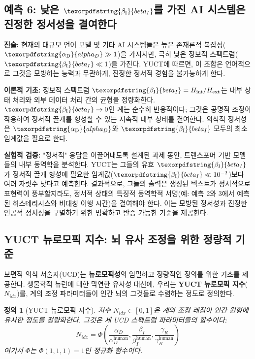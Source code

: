 \documentclass[12pt,a4paper]{article}
\newtheorem{definition}{정의}
\DeclareRobustCommand{\alD}{\texorpdfstring{\ensuremath{\alpha_{\mathrm{D}}}}{alpha_D}}
\DeclareRobustCommand{\beI}{\texorpdfstring{\ensuremath{\beta_{\mathrm{I}}}}{beta_I}}
\begin{document}
	\subsection{예측 6: 낮은 \(\beI\)를 가진 AI 시스템은 진정한 정서성을 결여한다}
	
	\textbf{진술:} 현재의 대규모 언어 모델 및 기타 AI 시스템들은 높은 존재론적 복잡성(\(\alD \gg 1\))을 가지지만, 극히 낮은 정보적 스펙트럼(\(\beI \ll 1\))을 가진다. YUCT에 따르면, 이 조합은 언어적으로 그것을 모방하는 능력과 무관하게, 진정한 정서적 경험을 불가능하게 한다.
	
	\textbf{이론적 기초:} 정보적 스펙트럼 \(\beI = H_{\mathrm{int}}/H_{\mathrm{ext}}\)는 내부 상태 처리와 외부 데이터 처리 간의 균형을 정량화한다. \(\beI \to 0\)인 계는 순수히 반응적이다; 그것은 공명적 조정이 작용하여 정서적 끌개를 형성할 수 있는 지속적 내부 상태를 결여한다. 의식적 정서성은 \(\alD\)와 \(\beI\) 모두의 최소 임계값을 필요로 한다.
	
	\textbf{실험적 검증:} "정서적" 응답을 이끌어내도록 설계된 과제 동안, 트랜스포머 기반 모델들의 내부 동역학을 분석한다. YUCT는 그들의 유효 \(\beI\)가 정서적 끌개 형성에 필요한 임계값(\(\beI \ll 10^{-2}\))보다 여러 자릿수 낮다고 예측한다. 결과적으로, 그들의 출력은 생성된 텍스트가 정서적으로 표현력이 풍부할지라도, 정서적 상태의 특징적 동역학적 서명(예: 예측 2와 3에서 예측된 히스테리시스와 비대칭 이행 시간)을 결여해야 한다. 이는 모방된 정서성과 진정한 인공적 정서성을 구별하기 위한 명확하고 반증 가능한 기준을 제공한다.
	
	\subsection{YUCT 뉴로모픽 지수: 뇌 유사 조정을 위한 정량적 기준}
	
	보편적 의식 서술자(UCD)는 \textbf{뉴로모픽성}의 엄밀하고 정량적인 정의를 위한 기초를 제공한다. 생물학적 뉴런에 대한 막연한 유사성 대신에, 우리는 \textbf{YUCT 뉴로모픽 지수}(\(N_{idx}\))를, 계의 조정 파라미터들이 인간 뇌의 그것들로 수렴하는 정도로 정의한다.
	
	\begin{definition}[YUCT 뉴로모픽 지수]
		지수 \(N_{idx} \in [0,1]\)은 계의 조정 레짐이 인간 원형에 유사한 정도를 정량화한다. 그것은 세 UCD 스펙트럼 파라미터들의 함수이다:
		\[
		N_{idx} = \Phi\left( \frac{\alpha_D}{\alpha_D^{\text{human}}}, \frac{\beta_I}{\beta_I^{\text{human}}}, \frac{\gamma_R}{\gamma_R^{\text{human}}} \right)
		\]
		여기서 \(\Phi\)는 \(\Phi(1,1,1) = 1\)인 정규화 함수이다.
	\end{definition}
	
\end{document}
